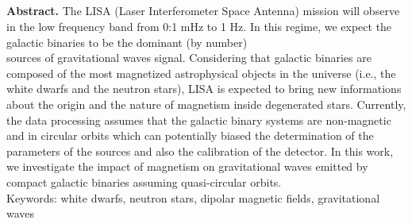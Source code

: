 \documentclass[a4paper,10.5pt]{article}
\author{nadiarosaleso }
\date{November 2022}
\begin{document}
\begin{center}
    \textbf{\\\vspace{2cm}\Large{}}
\end{center}

\\\vspace{0.4cm}\\

{\large{}}\\\vspace{-8cm}

{\small{\textbf{Abstract.} The LISA (Laser Interferometer Space Antenna) mission will observe in the low frequency band from 0:1 mHz to 1 Hz. In this regime, we expect the galactic binaries to be the dominant (by number)}\\ sources of gravitational waves signal. Considering that galactic binaries are composed of the most magnetized astrophysical objects in the universe (i.e., the white dwarfs and the neutron stars), LISA is expected to bring new informations about the origin and the nature of magnetism inside degenerated stars. Currently, the data processing assumes that the galactic binary systems are non-magnetic and in circular orbits which can potentially biased the determination of the parameters of the sources and also the calibration of the detector. In this work, we investigate the impact of magnetism on gravitational waves emitted by compact galactic binaries assuming quasi-circular orbits.\\\vspace{1mm}
Keywords: white dwarfs, neutron stars, dipolar magnetic fields, gravitational waves}
\end{document}
